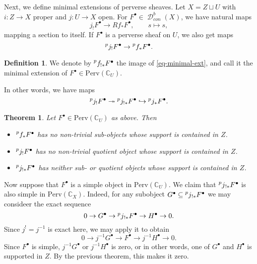 \documentclass[letterpaper, 12pt]{article}
\newcommand{\C}{\mathbb{C}}
\DeclareMathOperator{\D}{\mathcal{D}}
\newtheorem{theorem}{Theorem}
\theoremstyle{definition}
\newtheorem{definition}{Definition}
\theoremstyle{remark}
\newtheorem{example}{Example}
\begin{document}


Next, we define minimal extensions of perverse sheaves. Let $X = Z \sqcup U$ with $i: Z \to X$ proper and $j: U \to X$ open.
For $F^\bullet \in \D^b_{con}(X)$, we have natural maps
\begin{equation*}
    j_! F^\bullet \to Rf_* F^\bullet,\qquad s \mapsto s,
\end{equation*}
mapping a section to itself. If $F^\bullet$ is a perverse sheaf on $U$, we also get maps
\begin{equation} \label{eq-minimal-ext}
    \prescript{p}{}{j_!} F^\bullet \to \prescript{p}{}{f_*} F^\bullet.
\end{equation}

\begin{definition}
    We denote by $\prescript{p}{}{f_{!*}} F^\bullet$ the image of \eqref{eq-minimal-ext}, and call it the minimal extension of $F^\bullet \in \text{Perv}(\C_U)$.
\end{definition}
In other words, we have maps
\begin{equation}
    \prescript{p}{}{j_!} F^\bullet \twoheadrightarrow \prescript{p}{}{j_{!*}} F^\bullet
    \hookrightarrow \prescript{p}{}{j_*} F^\bullet.
\end{equation}

\begin{theorem}
    Let $F^\bullet \in \text{Perv}(\C_U)$ as above. Then
    \begin{itemize}
        \item[(i)] $\prescript{p}{}{f_*} F^\bullet$ has no non-trivial sub-objects whose support is contained in $Z$.
        \item[(ii)] $\prescript{p}{}{j_!} F^\bullet$ has no non-trivial quotient object whose support is contained in $Z$.
        \item[(iii)] $\prescript{p}{}{j_{!*}} F^\bullet$ has neither sub- or quotient objects whose support is contained in $Z$.
    \end{itemize}
\end{theorem}

Now suppose that $F^\bullet$ is a simple object in $\text{Perv}(\C_U)$.
We claim that $\prescript{p}{}{j}_{!*} F^\bullet$ is also simple in 
$\text{Perv}(\C_X)$. Indeed, for any subobject 
$G^\bullet \subseteq \prescript{p}{}{j}_{!*} F^\bullet$ we may consideer the exact sequence
\begin{equation}
    0 \to G^\bullet \to \prescript{p}{}{j}_{!*} F^\bullet \to H^\bullet \to 0.
\end{equation}
Since $j^! = j^{-1}$ is exact here, we may apply it to obtain
\begin{equation}
    0 \to j^{-1} G^\bullet \to F^\bullet \to j^{-1} H^\bullet \to 0.
\end{equation}
Since $F^\bullet$ is simple, $j^{-1}G^\bullet$ or $j^{-1} H^\bullet$ is zero,
or in other words, one of $G^\bullet$ and $H^\bullet$ is supported in $Z$.
By the previous theorem, this makes it zero.
\end{document}
